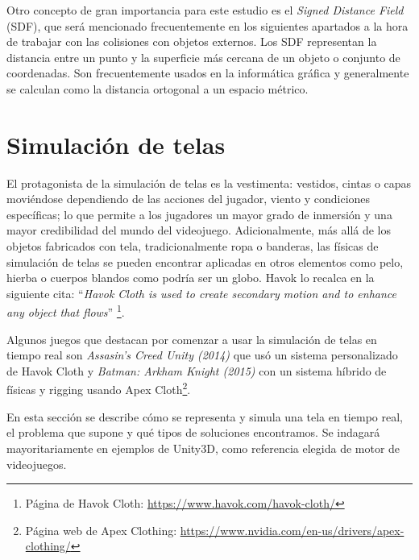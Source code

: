 Otro concepto de gran importancia para este estudio es el \textit{Signed Distance Field} (SDF), que será mencionado frecuentemente en los siguientes apartados a la hora de trabajar con las colisiones con objetos externos. Los SDF representan la distancia entre un punto y la superficie más cercana de un objeto o conjunto de coordenadas. Son frecuentemente usados en la informática gráfica y generalmente se calculan como la distancia ortogonal a un espacio métrico.


\section{Simulación de telas}
El protagonista de la simulación de telas es la vestimenta: vestidos, cintas o capas moviéndose dependiendo de las acciones del jugador, viento y condiciones específicas; lo que permite a los jugadores un mayor grado de inmersión y una mayor credibilidad del mundo del videojuego. Adicionalmente, más allá de los objetos fabricados con tela, tradicionalmente ropa o banderas, las físicas de simulación de telas se pueden encontrar aplicadas en otros elementos como pelo, hierba o cuerpos blandos como podría ser un globo. Havok lo recalca en la siguiente cita: ``\textit{Havok Cloth is used to create secondary motion and to enhance any object that flows}'' \footnote{Página de Havok Cloth: \url{https://www.havok.com/havok-cloth/}}. \newline

Algunos juegos que destacan por comenzar a usar la simulación de telas en tiempo real son \textit{Assasin's Creed Unity (2014)} \cite{acunity} que usó un sistema personalizado de Havok Cloth y \textit{Batman: Arkham Knight (2015)} \cite{batmanarkham} con un sistema híbrido de físicas y rigging usando Apex Cloth\footnote{Página web de Apex Clothing: \url{https://www.nvidia.com/en-us/drivers/apex-clothing/}}.

En esta sección se describe cómo se representa y simula una tela en tiempo real, el problema que supone y qué tipos de soluciones encontramos. Se indagará mayoritariamente en ejemplos de Unity3D, como referencia elegida de motor de videojuegos. 


